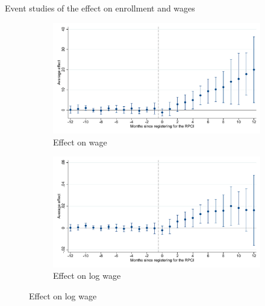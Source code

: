 \documentclass[notes,11pt, aspectratio=169]{beamer}
\begin{document}
\begin{frame}{Event studies of the effect on enrollment and wages}
\begin{figure}[H]
    \begin{subfigure}{0.38\textwidth}
    \caption{Effect on wage}
    \includegraphics[width=\textwidth]{04_Figures/muestra_10porciento/event_study_sal_cierre_dcdh.pdf}
    \end{subfigure}
    \begin{subfigure}{0.38\textwidth}
    \caption{Effect on log wage}
    \includegraphics[width=\textwidth]{04_Figures/muestra_10porciento/event_study_log_sal_cierre_dcdh.pdf}
    \end{subfigure}
    
\end{figure}
    
\end{frame}
\end{document}
